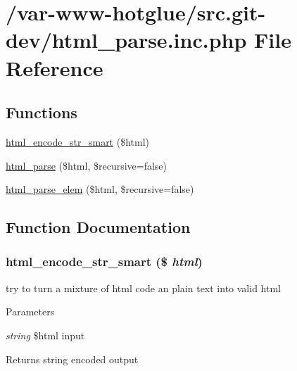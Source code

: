 \hypertarget{html__parse_8inc_8php}{
\section{/var-\/www-\/hotglue/src.git-\/dev/html\_\-parse.inc.php File Reference}
\label{html__parse_8inc_8php}
}
\subsection*{Functions}
\begin{DoxyCompactItemize}
\item 
\hyperlink{html__parse_8inc_8php_a7eda4037f4b2576b3bcd97408ff95bd5}{html\_\-encode\_\-str\_\-smart} (\$html)
\item 
\hyperlink{html__parse_8inc_8php_a1003b146f08aef5a3a78d75a3538a4d7}{html\_\-parse} (\$html, \$recursive=false)
\item 
\hyperlink{html__parse_8inc_8php_a6d9c21ee610953fb5b5b64fae3f74ed3}{html\_\-parse\_\-elem} (\$html, \$recursive=false)
\end{DoxyCompactItemize}


\subsection{Function Documentation}
\hypertarget{html__parse_8inc_8php_a7eda4037f4b2576b3bcd97408ff95bd5}{
\subsubsection[{html\_\-encode\_\-str\_\-smart}]{\setlength{\rightskip}{0pt plus 5cm}html\_\-encode\_\-str\_\-smart (\$ {\em html})}}
\label{html__parse_8inc_8php_a7eda4037f4b2576b3bcd97408ff95bd5}
try to turn a mixture of html code an plain text into valid html


\begin{DoxyParams}{Parameters}
\item[{\em string}]\$html input \end{DoxyParams}
\begin{DoxyReturn}{Returns}
string encoded output 
\end{DoxyReturn}


